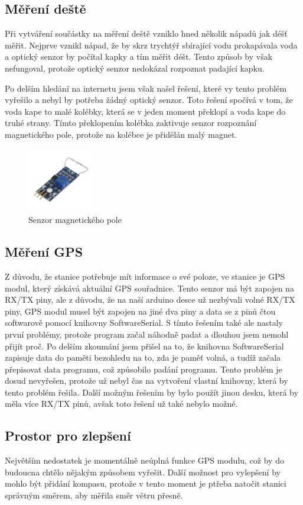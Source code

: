 \subsection{Měření deště}
Při vytváření součástky na měření deště vzniklo hned několik nápadů jak déšť měřit. Nejprve vznikl nápad, že by skrz trychtýř sbírající vodu prokapávala voda a optický senzor by počítal kapky a tím měřit déšt.
Tento způsob by však nefungoval, protože optický senzor nedokázal rozpoznat padající kapku.

Po delším hledání na internetu jsem však našel řešení\cite{mereni_deste}, které vy tento problém vyřešilo a nebyl by potřeba žádný optický senzor. Toto řešení spočívá v tom, že voda kape to malé kolébky, která se v jeden moment překlopí a voda kape do truhé strany.
Tímto překlopením kolébka zaktivuje senzor rozpoznání magnetického pole, protože na kolébce je přidělán malý magnet.

\begin{figure}[h] 
    \centering
    \includegraphics[width=0.25\textwidth]{images/magnet_sensor.jpg}
    \caption{Senzor magnetického pole}
\end{figure}

\subsection{Měření GPS}
Z důvodu, že stanice potřebuje mít informace o své poloze, ve stanice je GPS modul, který získává aktuální GPS souřadnice. Tento senzor má být zapojen na RX/TX piny, ale z důvodu, že na naší arduino desce už
nezbývali volné RX/TX piny, GPS modul musel být zapojen na jiné dva piny a data se z pinů čtou softwarově pomocí knihovny SoftwareSerial. S tímto řešením také ale nastaly první problémy, protože program začal náhodně padat a dlouhou jsem nemohl přijít proč.
Po delším zkoumání jsem přišel na to, že knihovna SoftwareSerial zapisuje data do paměti bezohledu na to, zda je paměť volná, a tudíž začala přepisovat data programu, což způsobilo padání programu.
Tento problém je dosud nevyřešen, protože už nebyl čas na vytvoření vlastní knihovny, která by tento problém řešila. Další možným řešením by bylo použít jinou desku, která by měla více RX/TX pinů, avšak toto řešení už také nebylo možné.

\subsection{Prostor pro zlepšení}
Největším nedostatek je momentálně neúplná funkce GPS modulu, což by do budoucna chtělo nějakým způsobem vyřešit.
Další možnost pro vylepšení by mohlo být přidání kompasu, protože v tento moment je ptřeba natočit stanici správným směrem, aby měřila směr větru přesně. 


